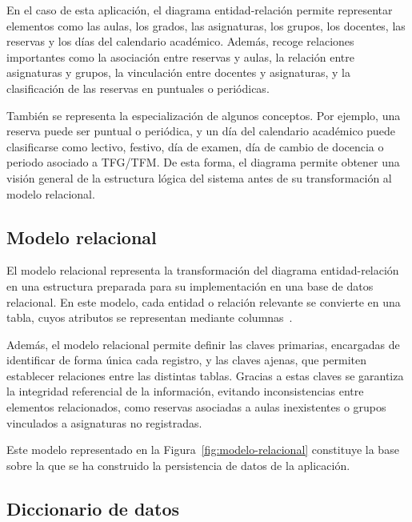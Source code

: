 En el caso de esta aplicación, el diagrama entidad-relación permite representar elementos como las aulas, los grados, las asignaturas, los grupos, los docentes, las reservas y los días del calendario académico. Además, recoge relaciones importantes como la asociación entre reservas y aulas, la relación entre asignaturas y grupos, la vinculación entre docentes y asignaturas, y la clasificación de las reservas en puntuales o periódicas.

También se representa la especialización de algunos conceptos. Por ejemplo, una reserva puede ser puntual o periódica, y un día del calendario académico puede clasificarse como lectivo, festivo, día de examen, día de cambio de docencia o periodo asociado a TFG/TFM. De esta forma, el diagrama permite obtener una visión general de la estructura lógica del sistema antes de su transformación al modelo relacional.



\subsection{Modelo relacional}

El modelo relacional representa la transformación del diagrama entidad-relación en una estructura preparada para su implementación en una base de datos relacional. En este modelo, cada entidad o relación relevante se convierte en una tabla, cuyos atributos se representan mediante columnas~\cite{modeloRelacional}.

Además, el modelo relacional permite definir las claves primarias, encargadas de identificar de forma única cada registro, y las claves ajenas, que permiten establecer relaciones entre las distintas tablas. Gracias a estas claves se garantiza la integridad referencial de la información, evitando inconsistencias entre elementos relacionados, como reservas asociadas a aulas inexistentes o grupos vinculados a asignaturas no registradas.

Este modelo representado en la Figura~\ref{fig:modelo-relacional} constituye la base sobre la que se ha construido la persistencia de datos de la aplicación.



\subsection{Diccionario de datos}

